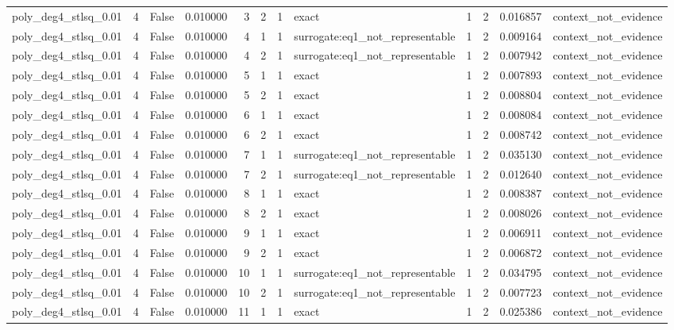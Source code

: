 \begin{tabular}{lrrrrrrlrrrl}
poly\_deg4\_stlsq\_0.01 & 4 & False & 0.010000 & 3 & 2 & 1 & exact & 1 & 2 & 0.016857 & context\_not\_evidence \\
poly\_deg4\_stlsq\_0.01 & 4 & False & 0.010000 & 4 & 1 & 1 & surrogate:eq1\_not\_representable & 1 & 2 & 0.009164 & context\_not\_evidence \\
poly\_deg4\_stlsq\_0.01 & 4 & False & 0.010000 & 4 & 2 & 1 & surrogate:eq1\_not\_representable & 1 & 2 & 0.007942 & context\_not\_evidence \\
poly\_deg4\_stlsq\_0.01 & 4 & False & 0.010000 & 5 & 1 & 1 & exact & 1 & 2 & 0.007893 & context\_not\_evidence \\
poly\_deg4\_stlsq\_0.01 & 4 & False & 0.010000 & 5 & 2 & 1 & exact & 1 & 2 & 0.008804 & context\_not\_evidence \\
poly\_deg4\_stlsq\_0.01 & 4 & False & 0.010000 & 6 & 1 & 1 & exact & 1 & 2 & 0.008084 & context\_not\_evidence \\
poly\_deg4\_stlsq\_0.01 & 4 & False & 0.010000 & 6 & 2 & 1 & exact & 1 & 2 & 0.008742 & context\_not\_evidence \\
poly\_deg4\_stlsq\_0.01 & 4 & False & 0.010000 & 7 & 1 & 1 & surrogate:eq1\_not\_representable & 1 & 2 & 0.035130 & context\_not\_evidence \\
poly\_deg4\_stlsq\_0.01 & 4 & False & 0.010000 & 7 & 2 & 1 & surrogate:eq1\_not\_representable & 1 & 2 & 0.012640 & context\_not\_evidence \\
poly\_deg4\_stlsq\_0.01 & 4 & False & 0.010000 & 8 & 1 & 1 & exact & 1 & 2 & 0.008387 & context\_not\_evidence \\
poly\_deg4\_stlsq\_0.01 & 4 & False & 0.010000 & 8 & 2 & 1 & exact & 1 & 2 & 0.008026 & context\_not\_evidence \\
poly\_deg4\_stlsq\_0.01 & 4 & False & 0.010000 & 9 & 1 & 1 & exact & 1 & 2 & 0.006911 & context\_not\_evidence \\
poly\_deg4\_stlsq\_0.01 & 4 & False & 0.010000 & 9 & 2 & 1 & exact & 1 & 2 & 0.006872 & context\_not\_evidence \\
poly\_deg4\_stlsq\_0.01 & 4 & False & 0.010000 & 10 & 1 & 1 & surrogate:eq1\_not\_representable & 1 & 2 & 0.034795 & context\_not\_evidence \\
poly\_deg4\_stlsq\_0.01 & 4 & False & 0.010000 & 10 & 2 & 1 & surrogate:eq1\_not\_representable & 1 & 2 & 0.007723 & context\_not\_evidence \\
poly\_deg4\_stlsq\_0.01 & 4 & False & 0.010000 & 11 & 1 & 1 & exact & 1 & 2 & 0.025386 & context\_not\_evidence \\

\end{tabular}
